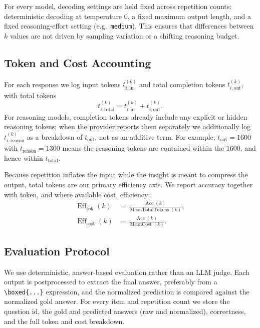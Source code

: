 For every model, decoding settings are held fixed across repetition counts:
deterministic decoding at temperature $0$, a fixed maximum output length, and a fixed
reasoning-effort setting (e.g.\ \texttt{medium}). This ensures that differences
between $k$ values are not driven by sampling variation or a shifting reasoning
budget.

\subsection{Token and Cost Accounting}
\label{sec:token-accounting}

For each response we log input tokens $t^{(k)}_{i,\mathrm{in}}$ and total completion
tokens $t^{(k)}_{i,\mathrm{out}}$, with total tokens
\[
    t^{(k)}_{i,\mathrm{total}} = t^{(k)}_{i,\mathrm{in}} + t^{(k)}_{i,\mathrm{out}}.
\]
For reasoning models, completion tokens already include any explicit or hidden
reasoning tokens; when the provider reports them separately we additionally log
$t^{(k)}_{i,\mathrm{reason}}$ as a breakdown of $t_{\mathrm{out}}$, not as an additive
term. For example, $t_{\mathrm{out}}=1600$ with $t_{\mathrm{reason}}=1300$ means the
reasoning tokens are contained within the $1600$, and hence within
$t_{\mathrm{total}}$.

Because repetition inflates the input while the insight is meant to compress the
output, total tokens are our primary efficiency axis. We report accuracy together with
token, and where available cost, efficiency:
\begin{align*}
    \operatorname{Eff}_{\mathrm{tok}}(k)  &= \frac{\operatorname{Acc}(k)}{\operatorname{MeanTotalTokens}(k)}, \\[4pt]
    \operatorname{Eff}_{\mathrm{cost}}(k) &= \frac{\operatorname{Acc}(k)}{\operatorname{MeanCost}(k)}.
\end{align*}

\subsection{Evaluation Protocol}
\label{sec:evaluation}

We use deterministic, answer-based evaluation rather than an LLM judge. Each output is
postprocessed to extract the final answer, preferably from a
\texttt{\textbackslash boxed\{...\}} expression, and the normalized prediction is
compared against the normalized gold answer. For every item and repetition count we
store the question id, the gold and predicted answers (raw and normalized),
correctness, and the full token and cost breakdown.

